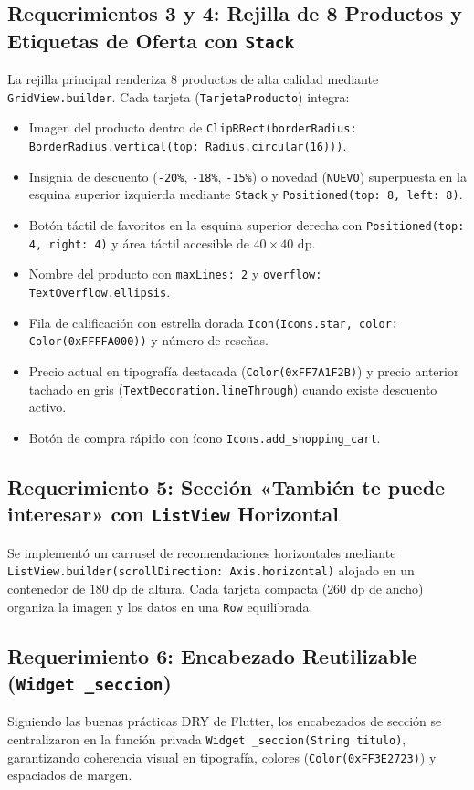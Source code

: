 \documentclass[12pt,a4paper]{article}
\begin{document}
\subsection{Requerimientos 3 y 4: Rejilla de 8 Productos y Etiquetas de Oferta con \texttt{Stack}}
La rejilla principal renderiza 8 productos de alta calidad mediante \texttt{GridView.builder}. Cada tarjeta (\texttt{TarjetaProducto}) integra:
\begin{itemize}
    \item Imagen del producto dentro de \texttt{ClipRRect(borderRadius: BorderRadius.vertical(top: Radius.circular(16)))}.
    \item Insignia de descuento (\texttt{-20\%}, \texttt{-18\%}, \texttt{-15\%}) o novedad (\texttt{NUEVO}) superpuesta en la esquina superior izquierda mediante \texttt{Stack} y \texttt{Positioned(top: 8, left: 8)}.
    \item Botón táctil de favoritos en la esquina superior derecha con \texttt{Positioned(top: 4, right: 4)} y área táctil accesible de $40 \times 40\text{ dp}$.
    \item Nombre del producto con \texttt{maxLines: 2} y \texttt{overflow: TextOverflow.ellipsis}.
    \item Fila de calificación con estrella dorada \texttt{Icon(Icons.star, color: Color(0xFFFFA000))} y número de reseñas.
    \item Precio actual en tipografía destacada (\texttt{Color(0xFF7A1F2B)}) y precio anterior tachado en gris (\texttt{TextDecoration.lineThrough}) cuando existe descuento activo.
    \item Botón de compra rápido con ícono \texttt{Icons.add\_shopping\_cart}.
\end{itemize}

\subsection{Requerimiento 5: Sección «También te puede interesar» con \texttt{ListView} Horizontal}
Se implementó un carrusel de recomendaciones horizontales mediante \texttt{ListView.builder(scrollDirection: Axis.horizontal)} alojado en un contenedor de $180\text{ dp}$ de altura. Cada tarjeta compacta ($260\text{ dp}$ de ancho) organiza la imagen y los datos en una \texttt{Row} equilibrada.

\subsection{Requerimiento 6: Encabezado Reutilizable (\texttt{Widget \_seccion})}
Siguiendo las buenas prácticas DRY de Flutter, los encabezados de sección se centralizaron en la función privada \texttt{Widget \_seccion(String titulo)}, garantizando coherencia visual en tipografía, colores (\texttt{Color(0xFF3E2723)}) y espaciados de margen.
\end{document}
